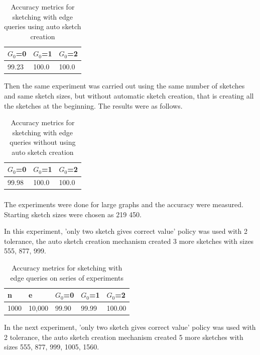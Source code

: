 \documentclass[12pt]{report}
\numberwithin{figure}{section}
\numberwithin{table}{section}
\begin{document}
\begin{table}[H]
\centering
\begin{tabular}{|l|l|l|}
\hline
$G_0$=0 & $G_0$=1 & $G_0$=2 \\ \hline
99.23  &   100.0  &   100.0\\ \hline
\end{tabular}
\caption{Accuracy metrics for sketching with edge queries using auto sketch creation}
\end{table}

Then the same experiment was carried out using the same number of sketches and same sketch sizes, but without automatic sketch creation, that is creating all the sketches at the beginning. The results were as follows.

\begin{table}[H]
\centering
\begin{tabular}{|l|l|l|}
\hline
$G_0$=0 & $G_0$=1 & $G_0$=2 \\ \hline
99.98  &   100.0  &   100.0\\ \hline
\end{tabular}
\caption{Accuracy metrics for sketching with edge queries without using auto sketch creation}
\end{table}

\paragraph{}

The experiments were done for large graphs and the accuracy were measured. Starting sketch sizes were chosen as 219 450. 

In this experiment, 'only two sketch gives correct value' policy was used with 2 tolerance, the auto sketch creation mechanism created 3 more sketches with sizes 555, 877, 999.  

\begin{table}[H]
\centering
\begin{tabular}{|l|l|l|l|l|}
\hline
n    & e     & $G_0$=0 & $G_0$=1 & $G_0$=2 \\ \hline
1000 & 10,000 & 99.90   & 99.99   & 100.00   \\ \hline
\end{tabular}
\caption{Accuracy metrics for sketching with edge queries on series of experiments}
\end{table}

In the next experiment, 'only two sketch gives correct value' policy was used with 2 tolerance, the auto sketch creation mechanism created 5 more sketches with sizes 555, 877, 999, 1005, 1560.  
\end{document}
